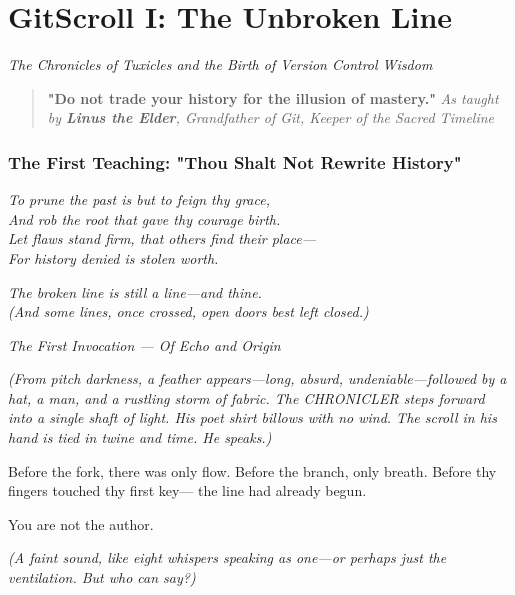 \chapter{GitScroll I: The Unbroken Line}
\label{chap:01-Unbroken-Line}

\emph{The Chronicles of Tuxicles and the Birth of Version Control Wisdom}

\begin{quote}
\textbf{"Do not trade your history for the illusion of mastery."} \emph{As taught by \textbf{Linus the Elder}, Grandfather of Git, Keeper of the Sacred Timeline}
\end{quote}

\subsection{The First Teaching: "Thou Shalt Not Rewrite History"}\label{the-first-teaching-thou-shalt-not-rewrite-history}

\emph{To prune the past is but to feign thy grace,}\\
\emph{And rob the root that gave thy courage birth.}\\
\emph{Let flaws stand firm, that others find their place---}\\
\emph{For history denied is stolen worth.}

\emph{The broken line is still a line---and thine.}\\
\emph{(And some lines, once crossed, open doors best left closed.)}

\bookdivider

\label{performing_arts-invocation-before-the-scroll}

\emph{The First Invocation --- Of Echo and Origin}

\emph{(From pitch darkness, a feather appears---long, absurd, undeniable---followed by a hat, a man, and a rustling storm of fabric. The CHRONICLER steps forward into a single shaft of light. His poet shirt billows with no wind. The scroll in his hand is tied in twine and time. He speaks.)}

 Before the fork, there was only flow. Before the branch, only breath. Before thy fingers touched thy first key--- the line had already begun.

You are not the author.

\emph{(A faint sound, like eight whispers speaking as one---or perhaps just the ventilation. But who can say?)}

